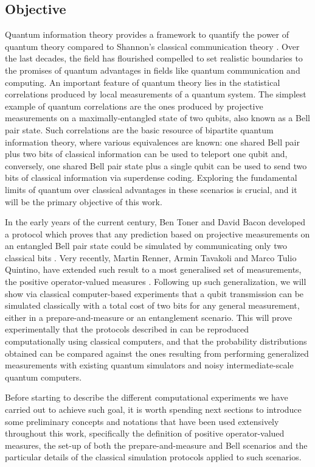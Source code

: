 \subsection{Objective}
Quantum information theory provides a framework to quantify the power of quantum theory compared to Shannon's classical communication theory \cite{shannon}. Over the last decades, the field has flourished compelled to set realistic boundaries to the promises of quantum advantages in fields like quantum communication and computing. An important feature of quantum theory lies in the statistical correlations produced by local measurements of a quantum system. The simplest example of quantum correlations are the ones produced by projective measurements on a maximally-entangled state of two qubits, also known as a Bell pair state. Such correlations are the basic resource of bipartite quantum information theory, where various equivalences are known: one shared Bell pair plus two bits of classical information can be used to teleport one  qubit and, conversely, one shared Bell pair state plus a single qubit can be used to send two bits of classical information via superdense coding. Exploring the fundamental limits of quantum over classical advantages in these scenarios is crucial, and it will be the primary objective of this work.
\par
In the early years of the current century, Ben Toner and David Bacon developed a protocol which proves that any prediction based on projective measurements on an entangled Bell pair state could be simulated by communicating only two classical bits \cite{toner2003}. Very recently, Martin Renner, Armin Tavakoli and Marco Tulio Quintino, have extended such result to a most generalised set of measurements, the positive operator-valued measures \cite{renner2022}.
Following up such generalization, we will show via classical computer-based experiments that a qubit transmission can be simulated classically with a total cost of two bits for any general measurement, either in a prepare-and-measure or an entanglement scenario. This will prove experimentally that the protocols described in \cite{renner2022} can be reproduced computationally using classical computers, and that the probability distributions obtained can be compared against the ones resulting from performing generalized measurements with existing quantum simulators and noisy intermediate-scale quantum computers.
\par
Before starting to describe the different computational experiments we have carried out to achieve such goal, it is worth spending next sections to introduce some preliminary concepts and notations that have been used extensively throughout this work, specifically the definition of positive operator-valued measures, the set-up of both the prepare-and-measure and Bell scenarios and the particular details of the classical simulation protocols applied to such scenarios.
\par
